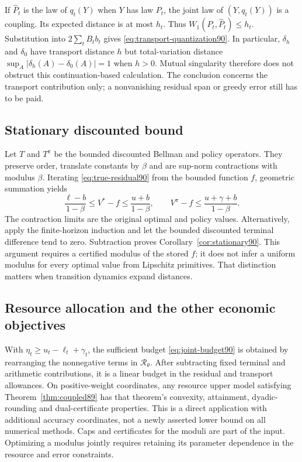If $\widehat P_t$ is the law of $q_t(Y)$ when $Y$ has law $P_t$, the joint law of $(Y,q_t(Y))$ is a coupling. Its expected distance is at most $h_t$. Thus $W_1(P_t,\widehat P_t)\le h_t$. Substitution into $2\sum_tB_tb_t$ gives \eqref{eq:transport-quantization90}. In particular, $\delta_h$ and $\delta_0$ have transport distance $h$ but total-variation distance $\sup_A|\delta_h(A)-\delta_0(A)|=1$ when $h>0$. Mutual singularity therefore does not obstruct this continuation-based calculation. The conclusion concerns the transport contribution only; a nonvanishing residual span or greedy error still has to be paid.

\subsection{Stationary discounted bound}
Let $T$ and $T^\pi$ be the bounded discounted Bellman and policy operators. They preserve order, translate constants by $\beta$ and are sup-norm contractions with modulus $\beta$. Iterating \eqref{eq:true-residual90} from the bounded function $f$, geometric summation yields
\[
 \frac{\ell-b}{1-\beta}\le V^*-f\le\frac{u+b}{1-\beta},
 \qquad
 V^\pi-f\le\frac{u+\gamma+b}{1-\beta}.
\]
The contraction limits are the original optimal and policy values. Alternatively, apply the finite-horizon induction and let the bounded discounted terminal difference tend to zero. Subtraction proves Corollary~\ref{cor:stationary90}. This argument requires a certified modulus of the stored $f$; it does not infer a uniform modulus for every optimal value from Lipschitz primitives. That distinction matters when transition dynamics expand distances.

\subsection{Resource allocation and the other economic objectives}
With $\eta_t\ge u_t-\ell_t+\gamma_t$, the sufficient budget \eqref{eq:joint-budget90} is obtained by rearranging the nonnegative terms in $\mathcal R_\theta$. After subtracting fixed terminal and arithmetic contributions, it is a linear budget in the residual and transport allowances. On positive-weight coordinates, any resource upper model satisfying Theorem~\ref{thm:coupled89} has that theorem's convexity, attainment, dyadic-rounding and dual-certificate properties. This is a direct application with additional accuracy coordinates, not a newly asserted lower bound on all numerical methods. Caps and certificates for the moduli are part of the input. Optimizing a modulus jointly requires retaining its parameter dependence in the resource and error constraints.

